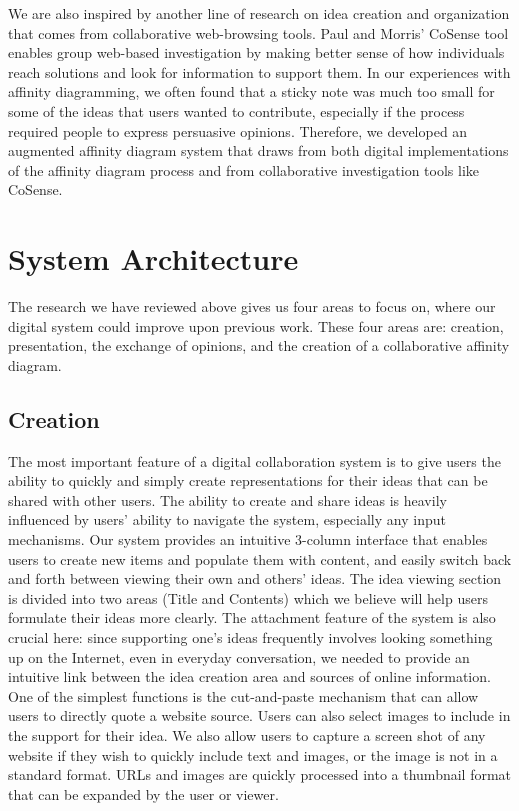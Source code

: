 \documentclass{sigchi}
\begin{document}
We are also inspired by another line of research on idea creation and organization that comes from collaborative web-browsing tools. Paul and Morris' CoSense tool enables group web-based investigation by making better sense of how individuals reach solutions and look for information to support them.\cite{Paul:2009:CES:1518701.1518974} In our experiences with affinity diagramming, we often found that a sticky note was much too small for some of the ideas that users wanted to contribute, especially if the process required people to express persuasive opinions. Therefore, we developed an augmented affinity diagram system that draws from both digital implementations of the affinity diagram process and from collaborative investigation tools like CoSense.


\section{System Architecture}
The research we have reviewed above gives us four areas to focus on, where our digital system could improve upon previous work. These four areas are: creation, presentation, the exchange of opinions, and the creation of a collaborative affinity diagram.


\subsection{Creation} The most important feature of a digital collaboration system is to give users the ability to quickly and simply create representations for their ideas that can be shared with other users. The ability to create and share ideas is heavily influenced by users' ability to navigate the system, especially any input mechanisms. Our system provides an intuitive 3-column interface that enables users to create new items and populate them with content, and easily switch back and forth between viewing their own and others' ideas. The idea viewing section is divided into two areas (Title and Contents) which we believe will help users formulate their ideas more clearly. The attachment feature of the system is also crucial here: since supporting one's ideas frequently involves looking something up on the Internet, even in everyday conversation, we needed to provide an intuitive link between the idea creation area and sources of online information. One of the simplest functions is the cut-and-paste mechanism that can allow users to directly quote a website source. Users can also select images to include in the support for their idea. We also allow users to capture a screen shot of any website if they wish to quickly include text and images, or the image is not in a standard format. URLs and images are quickly processed into a thumbnail format that can be expanded by the user or viewer.
\end{document}
